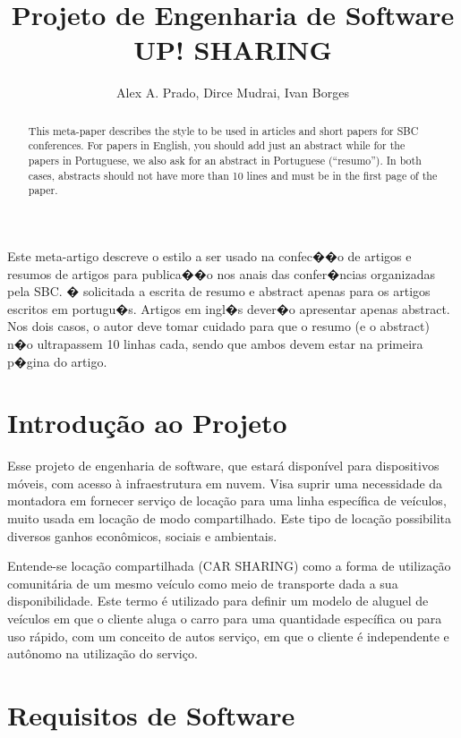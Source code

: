 \documentclass[12pt]{article}
\title{Projeto de Engenharia de Software \\ UP! SHARING}
\author{Alex A. Prado\inst{1}, Dirce Mudrai\inst{1}, Ivan Borges\inst{1} \email{alex.azprado@gmail.com, dirce.mudrai@icloud.com,
  ivangb@gmail.com}}
\begin{document}
 

\maketitle

\begin{abstract}


  This meta-paper describes the style to be used in articles and short papers
  for SBC conferences. For papers in English, you should add just an abstract
  while for the papers in Portuguese, we also ask for an abstract in
  Portuguese (``resumo''). In both cases, abstracts should not have more than
  10 lines and must be in the first page of the paper.
  
 
\end{abstract}
     
\begin{resumo} 
  Este meta-artigo descreve o estilo a ser usado na confec��o de artigos e
  resumos de artigos para publica��o nos anais das confer�ncias organizadas
  pela SBC. � solicitada a escrita de resumo e abstract apenas para os artigos
  escritos em portugu�s. Artigos em ingl�s dever�o apresentar apenas abstract.
  Nos dois casos, o autor deve tomar cuidado para que o resumo (e o abstract)
  n�o ultrapassem 10 linhas cada, sendo que ambos devem estar na primeira
  p�gina do artigo.
\end{resumo}


\section{Introdução ao Projeto}

Esse projeto de engenharia de software, que estará disponível para dispositivos móveis, com acesso à infraestrutura em nuvem. Visa suprir uma necessidade da montadora em fornecer serviço de locação para uma linha específica de veículos, muito usada em locação de modo compartilhado. Este tipo de locação possibilita diversos ganhos econômicos, sociais e ambientais.

Entende-se locação compartilhada (CAR SHARING) como a forma de utilização comunitária de um mesmo veículo como meio de transporte dada a sua disponibilidade. Este termo é utilizado para definir um modelo de aluguel de veículos em que o cliente aluga o carro para uma quantidade específica ou para uso rápido, com um conceito de autos serviço, em que o cliente é independente e autônomo na utilização do serviço.


\section{Requisitos de Software}
\end{document}

